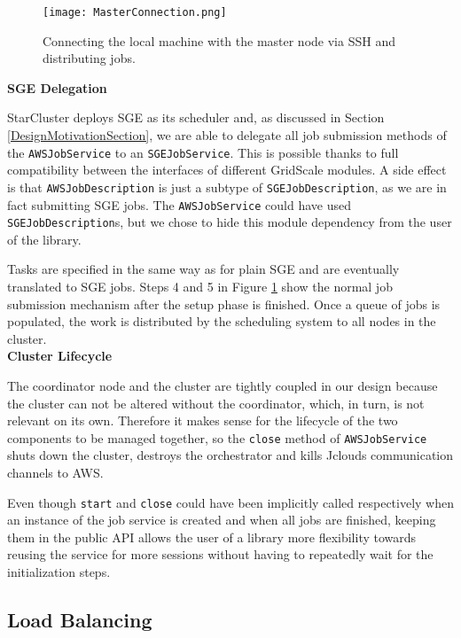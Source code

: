 \begin{figure}[h]
	\centering
		\texttt{[image: MasterConnection.png]}
	\caption{Connecting the local machine with the master node via SSH and distributing jobs.}
	\label{MasterConnection}
\end{figure}

\vspace{2mm}
\textbf{SGE Delegation}
\vspace{1mm}

StarCluster deploys SGE as its scheduler and, as discussed in Section \ref{DesignMotivationSection}, we are able to delegate all job submission methods of the \verb|AWSJobService| to an \verb|SGEJobService|. This is possible thanks to full compatibility between the interfaces of different GridScale modules. A side effect is that \verb|AWSJobDescription| is just a subtype of \verb|SGEJobDescription|, as we are in fact submitting SGE jobs. The \verb|AWSJobService| could have used \verb|SGEJobDescription|s, but we chose to hide this module dependency from the user of the library.

 Tasks are specified in the same way as for plain SGE and are eventually translated to SGE jobs. Steps 4 and 5 in Figure \ref{MasterConnection} show the normal job submission mechanism after the setup phase is finished. Once a queue of jobs is populated, the work is distributed by the scheduling system to all nodes in the cluster.\\

\vspace{3mm}
\textbf{Cluster Lifecycle}
\vspace{1mm}

The coordinator node and the cluster are tightly coupled in our design because the cluster can not be altered without the coordinator, which, in turn, is not relevant on its own. Therefore it makes sense for the lifecycle of the two components to be managed together, so the \verb|close| method of \verb|AWSJobService| shuts down the cluster, destroys the orchestrator and kills Jclouds communication channels to AWS.

Even though \verb|start| and \verb|close| could have been implicitly called respectively when an instance of the job service is created and when all jobs are finished, keeping them in the public API allows the user of a library more flexibility towards reusing the service for more sessions without having to repeatedly wait for the initialization steps.

\subsection{Load Balancing}

